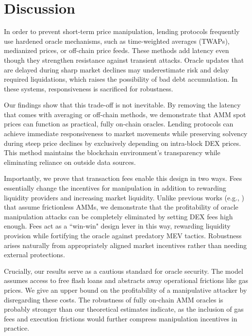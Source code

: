 \documentclass[11pt]{article} %
\begin{document}
\section{Discussion}\label{sec:conc}
In order to prevent short-term price manipulation, lending protocols frequently use hardened oracle mechanisms, such as time-weighted averages (TWAPs), medianized prices, or off-chain price feeds. These methods add latency even though they strengthen resistance against transient attacks. Oracle updates that are delayed during sharp market declines may underestimate risk and delay required liquidations, which raises the possibility of bad debt accumulation. In these systems, responsiveness is sacrificed for robustness.

Our findings show that this trade-off is not inevitable. By removing the latency that comes with averaging or off-chain methods, we demonstrate that AMM spot prices can function as practical, fully on-chain oracles. Lending protocols can achieve immediate responsiveness to market movements while preserving solvency during steep price declines by exclusively depending on intra-block DEX prices. This method maintains the blockchain environment's transparency while eliminating reliance on outside data sources.

Importantly, we prove that transaction fees enable this design in two ways. Fees essentially change the incentives for manipulation in addition to rewarding liquidity providers and increasing market liquidity. Unlike previous works (e.g., \cite{cohen23}) that assume frictionless AMMs, we demonstrate that the profitability of oracle manipulation attacks can be completely eliminated by setting DEX fees high enough. Fees act as a ``win-win" design lever in this way, rewarding liquidity provision while fortifying the oracle against predatory MEV tactics. Robustness arises naturally from appropriately aligned market incentives rather than needing external protections.

Crucially, our results serve as a cautious standard for oracle security. The model assumes access to free flash loans and abstracts away operational frictions like gas prices. We give an upper bound on the profitability of a manipulative attacker by disregarding these costs. The robustness of fully on-chain AMM oracles is probably stronger than our theoretical estimates indicate, as the inclusion of gas fees and execution frictions would further compress manipulation incentives in practice.

{\footnotesize
}
\newpage
\appendix
\end{document}
